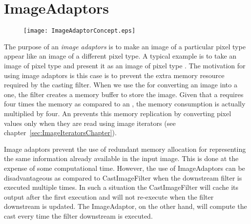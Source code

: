 
\chapter{ImageAdaptors}
\label{sec:ImageAdaptors}


\begin{figure}
\center
\texttt{[image: ImageAdaptorConcept.eps]}
\label{fig:ImageAdaptorConcept}
\end{figure}


The purpose of an \emph{image adaptors} is to make an image of a particular
pixel type appear like an image of a different pixel type. A typical example
is to take an image of pixel type  and present it as an
image of pixel type . The motivation for using image adaptors is
this case is to prevent the extra memory resource required by the casting
filter.  When we use the  for converting an
 image into a  one, the filter creates a
memory buffer to store the  image. Given that a 
requires four times the memory as compared to an , the
memory consumption is actually multiplied by four.  An 
prevents this memory replication by converting pixel values only when they
are read using image iterators (see chapter~\ref{sec:ImageIteratorsChapter}).

Image adaptors prevent the use of redundant memory allocation for
representing the same information already available in the input image. This
is done at the expense of some computational time. However, the use of
ImageAdaptors can be disadvantageous as compared to
CastImageFilter when the downstream filter is executed multiple
times. In such a situation the CastImageFilter will cache its output
after the first execution and will not re-execute when the filter downstream
is updated. The ImageAdaptor, on the other hand, will compute the cast
every time the filter downstream is executed.

